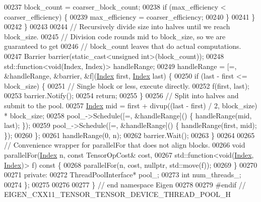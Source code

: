 \begin{DoxyCode}
00237         block\_count = coarser\_block\_count;
00238         \textcolor{keywordflow}{if} (max\_efficiency < coarser\_efficiency) \{
00239           max\_efficiency = coarser\_efficiency;
00240         \}
00241       \}
00242     \}
00243 
00244     \textcolor{comment}{// Recursively divide size into halves until we reach block\_size.}
00245     \textcolor{comment}{// Division code rounds mid to block\_size, so we are guaranteed to get}
00246     \textcolor{comment}{// block\_count leaves that do actual computations.}
00247     Barrier barrier(static\_cast<unsigned int>(block\_count));
00248     std::function<void(Index, Index)> handleRange;
00249     handleRange = [=, &handleRange, &barrier, &f](\hyperlink{namespace_eigen_a62e77e0933482dafde8fe197d9a2cfde}{Index} first, \hyperlink{namespace_eigen_a62e77e0933482dafde8fe197d9a2cfde}{Index} last) \{
00250       \textcolor{keywordflow}{if} (last - first <= block\_size) \{
00251         \textcolor{comment}{// Single block or less, execute directly.}
00252         f(first, last);
00253         barrier.Notify();
00254         \textcolor{keywordflow}{return};
00255       \}
00256       \textcolor{comment}{// Split into halves and submit to the pool.}
00257       \hyperlink{namespace_eigen_a62e77e0933482dafde8fe197d9a2cfde}{Index} mid = first + divup((last - first) / 2, block\_size) * block\_size;
00258       pool\_->Schedule([=, &handleRange]() \{ handleRange(mid, last); \});
00259       pool\_->Schedule([=, &handleRange]() \{ handleRange(first, mid); \});
00260     \};
00261     handleRange(0, n);
00262     barrier.Wait();
00263   \}
00264 
00265   \textcolor{comment}{// Convenience wrapper for parallelFor that does not align blocks.}
00266   \textcolor{keywordtype}{void} parallelFor(\hyperlink{namespace_eigen_a62e77e0933482dafde8fe197d9a2cfde}{Index} n, \textcolor{keyword}{const} TensorOpCost& cost,
00267                    std::function<\textcolor{keywordtype}{void}(\hyperlink{namespace_eigen_a62e77e0933482dafde8fe197d9a2cfde}{Index}, \hyperlink{namespace_eigen_a62e77e0933482dafde8fe197d9a2cfde}{Index})> f)\textcolor{keyword}{ const }\{
00268     parallelFor(n, cost, \textcolor{keyword}{nullptr}, std::move(f));
00269   \}
00270 
00271  \textcolor{keyword}{private}:
00272   ThreadPoolInterface* pool\_;
00273   \textcolor{keywordtype}{int} num\_threads\_;
00274 \};
00275 
00276 
00277 \}  \textcolor{comment}{// end namespace Eigen}
00278 
00279 \textcolor{preprocessor}{#endif // EIGEN\_CXX11\_TENSOR\_TENSOR\_DEVICE\_THREAD\_POOL\_H}
\end{DoxyCode}

